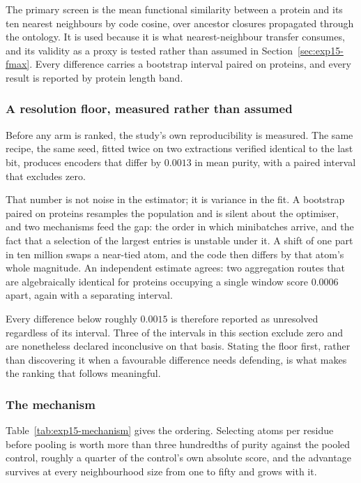 The primary screen is the mean functional similarity between a protein and its ten
nearest neighbours by code cosine, over ancestor closures propagated through the
ontology. It is used because it is what nearest-neighbour transfer consumes, and its
validity as a proxy is tested rather than assumed in
Section~\ref{sec:exp15-fmax}. Every difference carries a bootstrap interval paired on
proteins, and every result is reported by protein length band.

\subsubsection{A resolution floor, measured rather than assumed}
\label{sec:exp15-floor}

Before any arm is ranked, the study's own reproducibility is measured. The same
recipe, the same seed, fitted twice on two extractions verified identical to the
last bit, produces encoders that differ by $0.0013$ in mean purity, with a paired
interval that excludes zero.

That number is not noise in the estimator; it is variance in the fit. A bootstrap
paired on proteins resamples the population and is silent about the optimiser, and
two mechanisms feed the gap: the order in which minibatches arrive, and the fact that
a selection of the largest entries is unstable under it. A shift of one part in ten
million swaps a near-tied atom, and the code then differs by that atom's whole
magnitude. An independent estimate agrees: two aggregation routes that are
algebraically identical for proteins occupying a single window score $0.0006$ apart,
again with a separating interval.

Every difference below roughly $0.0015$ is therefore reported as unresolved
regardless of its interval. Three of the intervals in this section exclude zero and
are nonetheless declared inconclusive on that basis. Stating the floor first, rather
than discovering it when a favourable difference needs defending, is what makes the
ranking that follows meaningful.

\subsubsection{The mechanism}

Table~\ref{tab:exp15-mechanism} gives the ordering. Selecting atoms per residue
before pooling is worth more than three hundredths of purity against the pooled
control, roughly a quarter of the control's own absolute score, and the advantage
survives at every neighbourhood size from one to fifty and grows with it.

